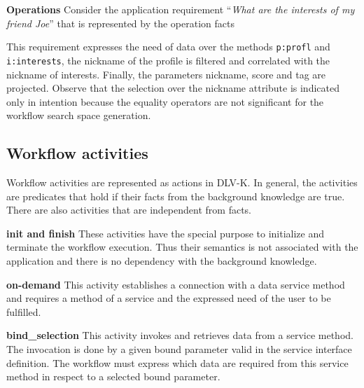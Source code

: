 
            
\textbf{Operations} Consider the application requirement ``\textit{What are the interests of my friend Joe}'' that is represented by the operation facts

%



This requirement expresses the need of data over the methods \texttt{p:profl} and \texttt{i:interests}, the nickname of the profile is filtered and correlated with the nickname of interests. Finally, the parameters nickname, score and tag are projected. Observe that the selection over the nickname attribute is indicated only in intention because the equality operators are not significant for the workflow search space generation.

\subsection{Workflow activities}
Workflow activities are represented as actions in DLV-K. In general, the activities are predicates that hold if their facts from the background knowledge are true. There are also activities that are independent from facts.
         
\textbf{init and finish} These activities have the special purpose to initialize and terminate the workflow execution. Thus their semantics is not associated with the application and there is no dependency with the background knowledge.

\textbf{on-demand} This activity establishes a connection with a data service method and requires a method of a service and the expressed need of the user to be fulfilled.

%



\textbf{bind_selection}
This activity invokes and retrieves data from a service method. The invocation is done by a given bound parameter valid in the service interface definition. The workflow must express which data are required from this service method in respect to a selected bound parameter.

